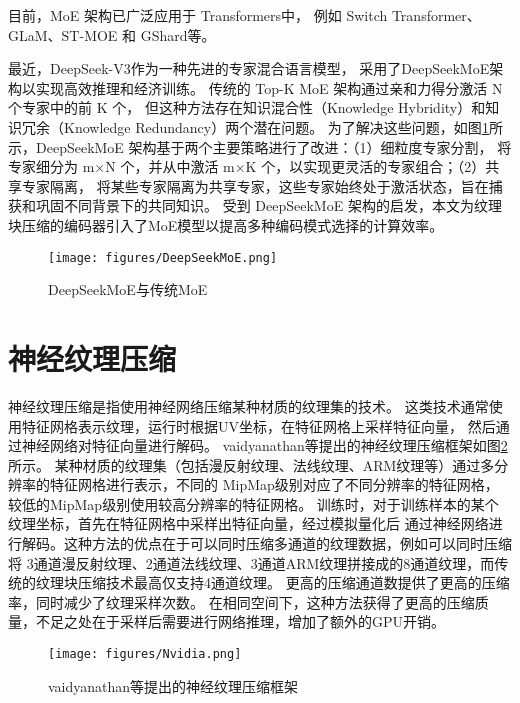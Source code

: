 目前，MoE 架构已广泛应用于 Transformers\cite{vaswani2017attention}中，
例如 Switch Transformer\cite{fedus2022switch}、
GLaM\cite{du2022glam}、ST-MOE\cite{zoph2022st}
和 GShard\cite{lepikhin2020gshard}等。


最近，DeepSeek-V3\cite{liu2024deepseek}作为一种先进的专家混合语言模型，
采用了DeepSeekMoE架构\cite{dai2024deepseekmoe}以实现高效推理和经济训练。
传统的 Top-K MoE 架构通过亲和力得分激活 N 个专家中的前 K 个，
但这种方法存在知识混合性（Knowledge Hybridity）和知识冗余（Knowledge Redundancy）两个潜在问题。
为了解决这些问题，如图\ref{fig:DeepSeekMoE}所示，DeepSeekMoE 架构基于两个主要策略进行了改进：（1）细粒度专家分割，
将专家细分为 m×N 个，并从中激活 m×K 个，以实现更灵活的专家组合；（2）共享专家隔离，
将某些专家隔离为共享专家，这些专家始终处于激活状态，旨在捕获和巩固不同背景下的共同知识。
受到 DeepSeekMoE 架构的启发，本文为纹理块压缩的编码器引入了MoE模型以提高多种编码模式选择的计算效率。

\begin{figure}[htbp]
    \centering
    \texttt{[image: figures/DeepSeekMoE.png]}
    \caption{DeepSeekMoE与传统MoE\cite{dai2024deepseekmoe}}
    \label{fig:DeepSeekMoE}
\end{figure}

\section{神经纹理压缩}

神经纹理压缩是指使用神经网络压缩某种材质的纹理集的技术。
这类技术通常使用特征网格表示纹理，运行时根据UV坐标，在特征网格上采样特征向量，
然后通过神经网络对特征向量进行解码。
vaidyanathan等\cite{vaidyanathan2023random}提出的神经纹理压缩框架如图\ref{fig:Nvidia}所示。
某种材质的纹理集（包括漫反射纹理、法线纹理、ARM纹理等）通过多分辨率的特征网格进行表示，不同的
MipMap级别对应了不同分辨率的特征网格，较低的MipMap级别使用较高分辨率的特征网格。
训练时，对于训练样本的某个纹理坐标，首先在特征网格中采样出特征向量，经过模拟量化后
通过神经网络进行解码。这种方法的优点在于可以同时压缩多通道的纹理数据，例如可以同时压缩将
3通道漫反射纹理、2通道法线纹理、3通道ARM纹理拼接成的8通道纹理，而传统的纹理块压缩技术最高仅支持4通道纹理。
更高的压缩通道数提供了更高的压缩率，同时减少了纹理采样次数。
在相同空间下，这种方法获得了更高的压缩质量，不足之处在于采样后需要进行网络推理，增加了额外的GPU开销。

\begin{figure}[htbp]
    \centering
    \texttt{[image: figures/Nvidia.png]}
    \caption{vaidyanathan\cite{vaidyanathan2023random}等提出的神经纹理压缩框架}
    \label{fig:Nvidia}
\end{figure}

